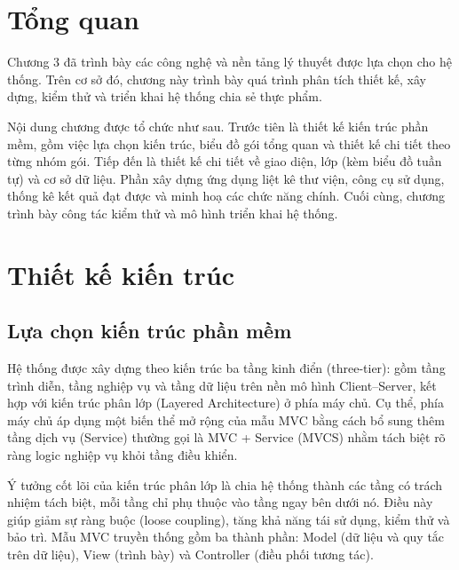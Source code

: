 \documentclass[../main.tex]{subfiles}%
\begin{document}
\setcounter{chapter}{4}

\section{Tổng quan}

Chương 3 đã trình bày các công nghệ và nền tảng lý thuyết được lựa chọn cho hệ thống. Trên cơ sở đó, chương này trình bày quá trình phân tích thiết kế, xây dựng, kiểm thử và triển khai hệ thống chia sẻ thực phẩm.

Nội dung chương được tổ chức như sau. Trước tiên là thiết kế kiến trúc phần mềm, gồm việc lựa chọn kiến trúc, biểu đồ gói tổng quan và thiết kế chi tiết theo từng nhóm gói. Tiếp đến là thiết kế chi tiết về giao diện, lớp (kèm biểu đồ tuần tự) và cơ sở dữ liệu. Phần xây dựng ứng dụng liệt kê thư viện, công cụ sử dụng, thống kê kết quả đạt được và minh hoạ các chức năng chính. Cuối cùng, chương trình bày công tác kiểm thử và mô hình triển khai hệ thống.

\section{Thiết kế kiến trúc}
\label{section:4.1}

\subsection{Lựa chọn kiến trúc phần mềm}
\label{subsection:4.1.1}

Hệ thống được xây dựng theo kiến trúc ba tầng kinh điển (three-tier): gồm tầng trình diễn, tầng nghiệp vụ và tầng dữ liệu trên nền mô hình Client--Server, kết hợp với kiến trúc phân lớp (Layered Architecture) ở phía máy chủ. Cụ thể, phía máy chủ áp dụng một biến thể mở rộng của mẫu MVC bằng cách bổ sung thêm tầng dịch vụ (Service) thường gọi là MVC + Service (MVCS) nhằm tách biệt rõ ràng logic nghiệp vụ khỏi tầng điều khiển.

Ý tưởng cốt lõi của kiến trúc phân lớp là chia hệ thống thành các tầng có trách nhiệm tách biệt, mỗi tầng chỉ phụ thuộc vào tầng ngay bên dưới nó. Điều này giúp giảm sự ràng buộc (loose coupling), tăng khả năng tái sử dụng, kiểm thử và bảo trì. Mẫu MVC truyền thống gồm ba thành phần: Model (dữ liệu và quy tắc trên dữ liệu), View (trình bày) và Controller (điều phối tương tác).
\end{document}
